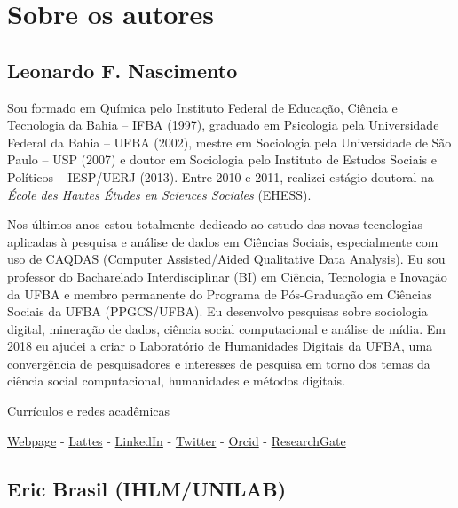 \documentclass[
]{book}
\begin{document}
\hypertarget{sobre-os-autores}{%
\chapter{Sobre os autores}\label{sobre-os-autores}}

\hypertarget{leonardo-f.-nascimento}{%
\section{Leonardo F. Nascimento}\label{leonardo-f.-nascimento}}

Sou formado em Química pelo Instituto Federal de Educação, Ciência e Tecnologia da Bahia -- IFBA (1997), graduado em Psicologia pela Universidade Federal da Bahia -- UFBA (2002), mestre em Sociologia pela Universidade de São Paulo -- USP (2007) e doutor em Sociologia pelo Instituto de Estudos Sociais e Políticos -- IESP/UERJ (2013). Entre 2010 e 2011, realizei estágio doutoral na \emph{École des Hautes Études en Sciences Sociales} (EHESS).

Nos últimos anos estou totalmente dedicado ao estudo das novas tecnologias aplicadas à pesquisa e análise de dados em Ciências Sociais, especialmente com uso de CAQDAS (Computer Assisted/Aided Qualitative Data Analysis). Eu sou professor do Bacharelado Interdisciplinar (BI) em Ciência, Tecnologia e Inovação da UFBA e membro permanente do Programa de Pós-Graduação em Ciências Sociais da UFBA (PPGCS/UFBA). Eu desenvolvo pesquisas sobre sociologia digital, mineração de dados, ciência social computacional e análise de mídia. Em 2018 eu ajudei a criar o Laboratório de Humanidades Digitais da UFBA, uma convergência de pesquisadores e interesses de pesquisa em torno dos temas da ciência social computacional,
humanidades e métodos digitais.

Currículos e redes acadêmicas

\href{https://leofn.com/}{Webpage} -
\href{http://lattes.cnpq.br/7141811368487014}{Lattes} - \href{https://www.linkedin.com/in/leonardo-nascimento-labhdufba/}{LinkedIn} - \href{https://twitter.com/leofn3}{Twitter} -
\href{https://orcid.org/0000-0003-2929-1115}{Orcid} - \href{https://www.researchgate.net/profile/Leonardo-Nascimento-2}{ResearchGate}

\hypertarget{eric-brasil-ihlmunilab}{%
\section{Eric Brasil (IHLM/UNILAB)}\label{eric-brasil-ihlmunilab}}
\end{document}
